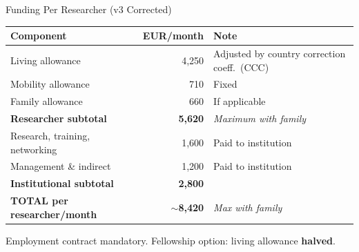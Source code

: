\documentclass[aspectratio=169]{beamer}
\begin{document}
\begin{frame}{Funding Per Researcher (v3 Corrected)}
\renewcommand{\arraystretch}{1.25}
\begin{center}
\small
\begin{tabular}{@{}l r p{5cm}@{}}
  \toprule
  \textbf{Component} & \textbf{EUR/month} & \textbf{Note} \\
  \midrule
  Living allowance        & 4,250 & Adjusted by country correction coeff.\ (CCC) \\
  Mobility allowance      & 710   & Fixed \\
  Family allowance        & 660   & If applicable \\
  \rowcolor{euLightBlue}
  \textbf{Researcher subtotal} & \textbf{5,620} & \textit{Maximum with family} \\
  \midrule
  Research, training, networking & 1,600 & Paid to institution \\
  Management \& indirect         & 1,200 & Paid to institution \\
  \rowcolor{euLightBlue}
  \textbf{Institutional subtotal} & \textbf{2,800} & \\
  \midrule
  \rowcolor{euGold!25}
  \textbf{TOTAL per researcher/month} & \textbf{${\sim}$8,420} & \textit{Max with family} \\
  \bottomrule
\end{tabular}
\end{center}
\vspace{4pt}
\textcolor{euBlue}{\small Employment contract mandatory.  Fellowship option: living allowance \textbf{halved}.}
\end{frame}
\end{document}
